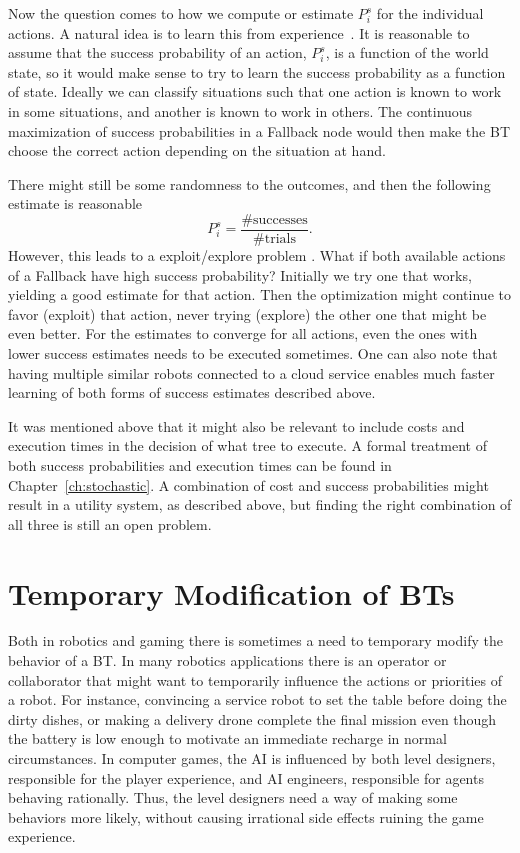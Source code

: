Now the question comes to how we compute or estimate $P^s_i$ for the individual actions. A natural idea
is to learn this from experience~\cite{hannaford2016simulation}.
It is reasonable to assume that the success probability of an action, $P^s_i$, is  a function of the world state, so it would make sense to try to learn
the success probability as a function of state. Ideally we can classify situations such that one action is known to work in some situations,
and another is known to work in others. The continuous maximization of success probabilities in a Fallback node would then make
the BT choose the correct action depending on the situation at hand.

There might still be some randomness to the outcomes, and then the following estimate is reasonable
\begin{equation}
  P^s_i = \frac{\mbox{\# successes}}{\mbox{\# trials}}. 
\end{equation}
However, this leads to a exploit/explore problem \cite{hannaford2016simulation}. What if both available actions of a Fallback have high success probability?
Initially we try one that works, yielding a good estimate for that action. Then the optimization might continue to favor (exploit) that action,
never trying (explore) the other one that might be even better. For the estimates to converge for all actions, even the ones with
lower success estimates needs to be executed sometimes. One can also note that having multiple similar  robots connected to a cloud service
enables much faster learning of both forms of success estimates described above.

It was mentioned above that it might also be relevant to 
 include costs and execution times in the decision of what tree to execute. A formal treatment of both success probabilities and execution times can be found in 
 Chapter~\ref{ch:stochastic}. A combination of cost and success probabilities might result in a utility system, as described above, but finding the right combination of all three is still an open problem. 
 

\section{Temporary Modification of BTs}
Both in robotics and gaming there is sometimes a need to temporary modify the behavior of a BT.
In many robotics applications there is  an operator or collaborator that might want to temporarily 
influence the actions or priorities of a robot. For instance, convincing a service robot to set the table 
before doing the dirty dishes, or making a delivery drone complete the final mission even though
the battery is low enough to motivate an immediate recharge in normal circumstances.
In computer games, the AI is influenced by both level designers, responsible for the player experience,
and AI engineers, responsible for agents behaving rationally.
Thus, the level designers need a way of making some behaviors more likely, without causing
irrational side effects ruining the game experience.

